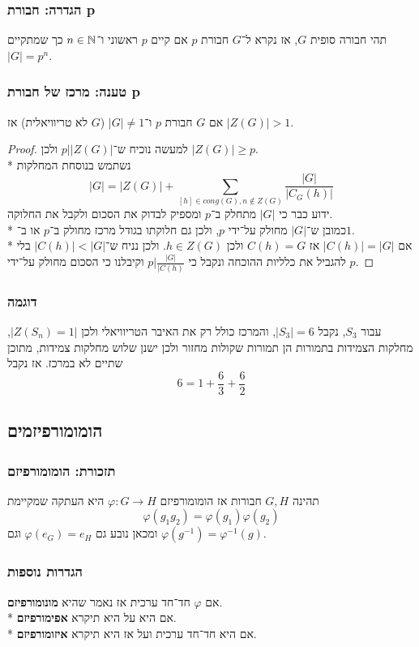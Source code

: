 \subsubsection{הגדרה: חבורת p}
תהי חבורה סופית $G$, אז נקרא ל־$G$ חבורת $p$ אם קיים $p$ ראשוני ו־$n \in \mathbb{N}$ כך שמתקיים $|G| = p^n$.

\subsubsection{טענה: מרכז של חבורת p}
אם $G$ חבורת $p$ ו־$|G| \ne 1$ ($G$ לא טריוויאלית) אז $|Z(G)| > 1$.
\begin{proof}
	למעשה נוכיח ש־$p \Big| |Z(G)|$ ולכן $|Z(G)| \ge p$. \\*
	נשתמש בנוסחת המחלקות
	\[
		|G| = |Z(G)| + \sum_{[h] \in cong(G), n \notin Z(G)} \frac{|G|}{|C_G(h)|}
	\]
	ידוע כבר כי $|G|$ מתחלק ב־$p$ ומספיק לבדוק את הסכום ולקבל את החלוקה. \\*
	כמובן ש־$|G|$ מחולק על־ידי $p$, ולכן גם חלוקתו בגודל מרכז מחולק ב־$p$ או ב־$1$. \\*
	אם $|C(h)| = |G|$ אז $C(h) = G$ ולכן $h \in Z(G)$. ולכן נניח ש־$|C(h)| < |G|$ בלי להגביל את כלליות ההוכחה ונקבל כי $p \Big| \frac{|G|}{|C(h)}$ וקיבלנו כי הסכום מחולק על־ידי $p$.
\end{proof}

\subsubsection{דוגמה}
עבור $S_3$, נקבל $|S_3| = 6$, והמרכז כולל רק את האיבר הטריוויאלי ולכן $|Z(S_n) = 1|$,
מחלקות הצמידות בתמורות הן תמורות שקולות מחזור ולכן ישנן שלוש מחלקות צמידות, מתוכן שתיים לא במרכז.
אז נקבל
\[
	6 = 1 + \frac{6}{3} + \frac{6}{2}
\]

\subsection{הומומורפיזמים}
\subsubsection{תזכורת: הומומורפיזם}
תהינה $G, H$ חבורות אז הומומורפיזם $\varphi : G \to H$ היא העתקה שמקיימת
\[
	\varphi(g_1 g_2) = \varphi(g_1) \varphi(g_2)
\]
ומכאן נובע גם $\varphi(e_G) = e_H$ וגם $\varphi(g^{-1}) = \varphi^{-1}(g)$.

\subsubsection{הגדרות נוספות}
אם $\varphi$ חד־חד ערכית אז נאמר שהיא \textbf{מונומורפיזם}. \\*
אם היא על היא תיקרא \textbf{אפימורפיזם}. \\*
אם היא חד־חד ערכית ועל אז היא תיקרא \textbf{איזומורפיזם}.

